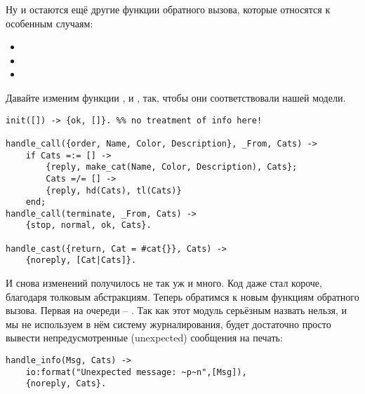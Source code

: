 Ну и остаются ещё другие функции обратного вызова, которые относятся к особенным случаям:
\begin{itemize}
    \item {}
    \item {}
    \item {}
\end{itemize}

Давайте изменим функции ,  и , так, чтобы они соответствовали нашей модели.
\begin{lstlisting}[style=erlang]
%%% Server functions
init([]) -> {ok, []}. %% no treatment of info here!
 
handle_call({order, Name, Color, Description}, _From, Cats) ->
    if Cats =:= [] ->
        {reply, make_cat(Name, Color, Description), Cats};
        Cats =/= [] ->
        {reply, hd(Cats), tl(Cats)}
    end;
handle_call(terminate, _From, Cats) ->
    {stop, normal, ok, Cats}.
 
handle_cast({return, Cat = #cat{}}, Cats) ->
    {noreply, [Cat|Cats]}.
\end{lstlisting}

И снова изменений получилось не так уж и много.
Код даже стал короче, благодаря толковым абстракциям.
Теперь обратимся к новым функциям обратного вызова.
Первая на очереди \--- .
Так как этот модуль серьёзным назвать нельзя, и мы не используем в нём систему журналирования, будет достаточно просто вывести непредусмотренные (unexpected) сообщения на печать:
\begin{lstlisting}[style=erlang]
handle_info(Msg, Cats) ->
    io:format("Unexpected message: ~p~n",[Msg]),
    {noreply, Cats}.
\end{lstlisting}

